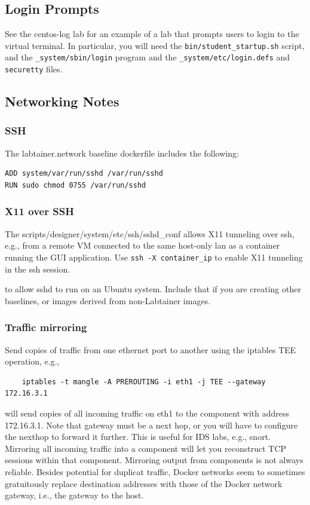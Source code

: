 \documentclass[12pt]{article}
\begin{document}
\subsection{Login Prompts}
See the centos-log lab for an example of a lab that prompts users to login to the virtual terminal.
In particular, you will need the {\tt bin/student\_startup.sh} script, and the {\tt \_system/sbin/login} program and the {\tt \_system/etc/login.defs} and {\tt securetty} files.

\subsection{Networking Notes}
\label{Networking Notes}
\subsubsection{SSH}
The labtainer.network baseline dockerfile includes the following:
\begin{verbatim}
ADD system/var/run/sshd /var/run/sshd
RUN sudo chmod 0755 /var/run/sshd
\end{verbatim}

\subsubsection{X11 over SSH}
The scripts/designer/system/etc/ssh/sshd\_conf allows X11 tunneling over ssh, e.g.,
from a remote VM connected to the same host-only lan as a container running the GUI
application.  Use {\tt ssh -X container\_ip} to enable X11 tunneling in the ssh session.

\noindent to allow sshd to run on an Ubuntu system. Include that if you are creating
other baselines, or images derived from non-Labtainer images.
\subsubsection{Traffic mirroring}
Send copies of traffic from one ethernet port to another using the iptables TEE operation, e.g.,
\begin{verbatim}
    iptables -t mangle -A PREROUTING -i eth1 -j TEE --gateway 172.16.3.1
\end{verbatim}
\noindent will send copies of all incoming traffic on eth1 to the component with address 172.16.3.1.
Note that gateway must be a next hop, or you will have to configure the nexthop to forward it further.
This is useful for IDS labs, e.g., snort.  Mirroring all incoming traffic into a component will let you
reconstruct TCP sessions within that component.  Mirroring output from components is not always reliable.
Besides potential for duplicat traffic, Docker networks seem to sometimes gratuitously replace destination
addresses with those of the Docker network gateway, i.e., the gateway to the host.
\end{document}
